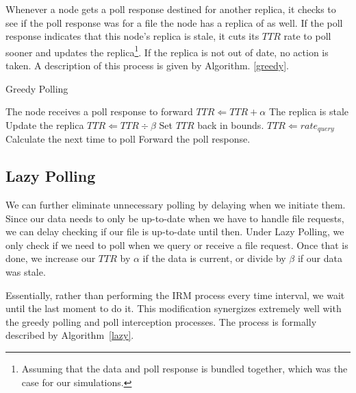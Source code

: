 \documentclass[10pt, conference, compsocconf, letterpaper]{IEEEtran} %
\begin{document}
Whenever a node gets a poll response destined  for another replica, it checks to see if the poll response was for a file the node has a replica of as well.  If the poll response indicates that this node's replica is stale, it cuts its $TTR$ rate to poll sooner and updates the replica\footnote{Assuming that the data and poll response is bundled together, which was the case for our simulations.}.  If the replica is not out of date, no action is taken.  A description of this process is given by Algorithm. \ref{greedy}.


\begin{algorithm}                      %
\caption{Greedy Polling}          %
\label{greedy}                           %
\begin{algorithmic}[1]                    %
	\State The node receives a poll response to forward
			\State $TTR \Leftarrow TTR + \alpha$
		\Else \Comment The replica is stale
			\State Update the replica
			\State $TTR \Leftarrow TTR \div \beta$
		\EndIf
		\State Set $TTR$ back in bounds.
	\EndIf
		\State $TTR \Leftarrow rate_{query}$  
	\EndIf
		\State Calculate the next time to poll
	\EndIf
	\State Forward the poll response.
\end{algorithmic}
\end{algorithm}




\subsection{Lazy Polling}
We can further eliminate unnecessary polling by delaying when we initiate them.  Since our data needs to only be up-to-date when we have to handle file requests, we can delay checking if our file is up-to-date until then. Under Lazy Polling, we only check if we need to poll when we query or receive a file request.  Once that is done, we increase our $TTR$ by $\alpha$ if the data is current, or divide by $\beta$ if our data was stale.  

Essentially, rather than performing the IRM process every time interval, we wait until the last moment to do it. This modification synergizes extremely well with the greedy polling and poll interception processes.  The process is formally described by Algorithm~\ref{lazy}. 
\end{document}
